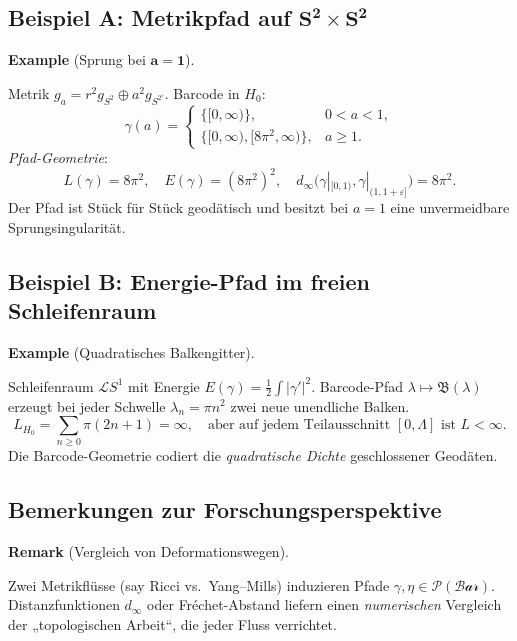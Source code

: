 \documentclass[10pt, letterpaper]{article}
\newcommand{\CustomHeading}[3]{%
  \par\medskip\noindent%
  \textbf{#1 #2} \textnormal{(#3)}.\enskip%
}
\newenvironment{REM}[2]{\CustomHeading{Remark}{#1}{#2}}{}
\newenvironment{EXA}[2]{\CustomHeading{Example}{#1}{#2}}{}
\begin{document}
\subsection{Beispiel A: Metrikpfad auf \(\boldsymbol{S^{2}\times S^{2}}\)}

\begin{EXA}{}{Sprung bei \(\boldsymbol{a=1}\)}
  Metrik \(g_a=r^{2}g_{S^{2}}\oplus a^{2}g_{S^{2'}}\).
  Barcode in \(H_{0}\):
  \[
    \gamma(a)=
    \begin{cases}
      \{[0,\infty)\}, & 0<a<1,\\
      \{[0,\infty),[8\pi^{2},\infty)\}, & a\ge1.
    \end{cases}
  \]
  \emph{Pfad-Geometrie}:
  \[
    L(\gamma)=8\pi^{2},
    \quad
    E(\gamma)=(8\pi^{2})^{2},
    \quad
    d_{\infty}\bigl(\gamma|_{[0,1)},\gamma|_{(1,1+\varepsilon]}\bigr)=8\pi^{2}.
  \]
  Der Pfad ist Stück für Stück geodätisch und besitzt bei \(a=1\)
  eine unvermeidbare Sprung­singularität.
\end{EXA}

\subsection{Beispiel B: Energie-Pfad im freien Schleifenraum}

\begin{EXA}{}{Quadratisches Balkengitter}
  Schleifenraum \(\mathcal L S^{1}\) mit Energie
  \(E(\gamma)=\tfrac12\int|\gamma'|^{2}\).
  Barcode-Pfad
  \(\lambda\mapsto\mathfrak B(\lambda)\) erzeugt bei jeder Schwelle
  \(\lambda_n=\pi n^{2}\) zwei neue unendliche Balken.
  \[
    L_{\!H_0}=\sum_{n\ge0}\pi(2n+1)=\infty,
    \quad
    \text{aber auf jedem Teilausschnitt }[0,\Lambda]\text{ ist }L<\infty.
  \]
  Die Barcode-Geometrie codiert die
  \emph{quadratische Dichte} geschlossener Geodäten.
\end{EXA}

\subsection{Bemerkungen zur Forschungsperspektive}

\begin{REM}{}{Vergleich von Deformationswegen}
  Zwei Metrikflüsse (say Ricci vs.\ Yang–Mills) induzieren Pfade
  \(\gamma,\eta\in\mathcal P(\mathcal{Bar})\).
  Distanzfunktionen \(d_\infty\) oder Fréchet-Abstand liefern
  einen \emph{numerischen} Vergleich der „topologischen Arbeit“, die
  jeder Fluss verrichtet.
\end{REM}
\end{document}
